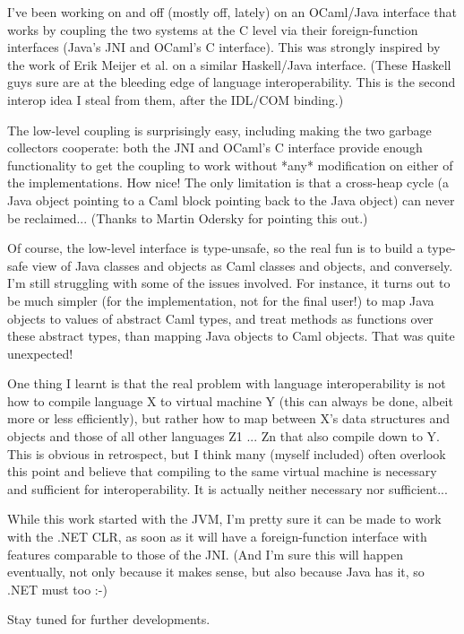 \documentclass[acmsmall]{acmart}\settopmatter{}
\begin{document}
\begin{verbquote}
I've been working on and off (mostly off, lately) on an OCaml/Java interface that works by coupling the two systems at the C level via their foreign-function interfaces (Java's JNI and OCaml's C interface).  This was strongly inspired by the work of Erik Meijer et al. on a similar Haskell/Java interface.  (These Haskell guys sure are at the bleeding edge of language interoperability.  This is the second interop idea I steal from them, after the IDL/COM binding.)

The low-level coupling is surprisingly easy, including making the two garbage collectors cooperate: both the JNI and OCaml's C interface provide enough functionality to get the coupling to work without *any* modification on either of the implementations.  How nice! The only limitation is that a cross-heap cycle (a Java object pointing to a Caml block pointing back to the Java object) can never be reclaimed... (Thanks to Martin Odersky for pointing this out.)

Of course, the low-level interface is type-unsafe, so the real fun is to build a type-safe view of Java classes and objects as Caml classes and objects, and conversely.  I'm still struggling with some of the issues involved.  For instance, it turns out to be much simpler (for the implementation, not for the final user!) to map Java objects to values of abstract Caml types, and treat methods as functions over these abstract types, than mapping Java objects to Caml objects.  That was quite unexpected!

One thing I learnt is that the real problem with language interoperability is not how to compile language X to virtual machine Y (this can always be done, albeit more or less efficiently), but rather how to map between X's data structures and objects and those of all other languages Z1 ... Zn that also compile down to Y.  This is obvious in retrospect, but I think many (myself included) often overlook this point and believe that compiling to the same virtual machine is necessary and sufficient for interoperability.  It is actually neither necessary nor sufficient...

While this work started with the JVM, I'm pretty sure it can be made to work with the .NET CLR, as soon as it will have a foreign-function interface with features comparable to those of the JNI.  (And I'm sure this will happen eventually, not only because it makes sense, but also because Java has it, so .NET must too :-)

Stay tuned for further developments.
\end{verbquote}
\end{document}
